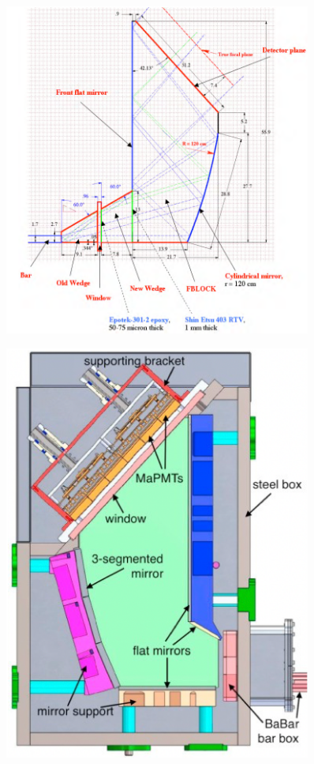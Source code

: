 \begin{figure}[!h]
\begin{minipage}{0.6\textwidth}
\includegraphics[width=0.9\textwidth]{pics/fdirc.png} 
\end{minipage} 
\begin{minipage}{0.4\textwidth}
\includegraphics[width=0.9\textwidth]{pics/pc.png}\\

\end{minipage}
\end{figure}

